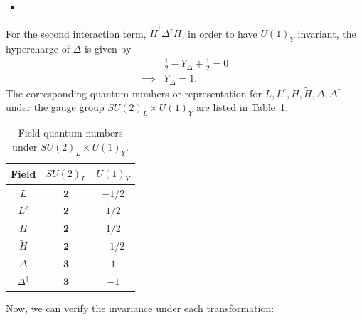 \answer{}
\begin{itemize}
    \item [(a)]
\end{itemize}
For the second interaction term, $\tilde{H}^\dagger\Delta^\dagger H$, in order to have $U(1)_Y$ invariant, the hypercharge of $\Delta$ is given by 
\begin{align}
    &\frac{1}{2}-Y_\Delta +\frac{1}{2}  = 0 \\
    \implies& Y_\Delta = 1.
\end{align}
The corresponding quantum numbers or representation for $L,L^c,H,\tilde{H},\Delta,\Delta^\dagger$ under the gauge group $SU(2)_L\times U(1)_Y$ are listed in Table~\ref{table:HW6-quantum}. 

\begin{table}[!ht]
\centering 
    \begin{tabular}{|c|c|c|}
    \hline
    Field & $SU(2)_L$ & $U(1)_Y$ \\
    \hline
    $L$  &   $\mathbf{2}$ &  $-1/2$    \\
    $L^c$  &   $\mathbf{2}$ &  $1/2$    \\
    $H$  &   $\mathbf{2}$ &  $1/2$    \\
    $\tilde{H}$  &   $\mathbf{2}$ &  $-1/2$    \\
    $\Delta$  &   $\mathbf{3}$ &  $1$    \\
    $\Delta^\dagger$  &   $\mathbf{3}$ &  $-1$    \\
    \hline
    \end{tabular}
    \caption{Field quantum numbers under $SU(2)_L \times U(1)_Y$.}
    \label{table:HW6-quantum}
\end{table}
Now, we can verify the invariance under each transformation:
